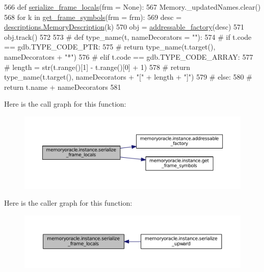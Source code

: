 \begin{DoxyCode}
566 \textcolor{keyword}{def }\hyperlink{namespacememoryoracle_1_1instance_a958b2f6afa09c327a9e48bbe2fc7f125}{serialize\_frame\_locals}(frm = None):
567     Memory.\_updatedNames.clear()
568     \textcolor{keywordflow}{for} k \textcolor{keywordflow}{in} \hyperlink{namespacememoryoracle_1_1instance_a31e7e3135691ee03e847163a5b1e3950}{get\_frame\_symbols}(frm = frm):
569         desc = \hyperlink{classmemoryoracle_1_1descriptions_1_1MemoryDescription}{descriptions.MemoryDescription}(k)
570         obj = \hyperlink{namespacememoryoracle_1_1instance_ac651a8635b1ae2ee7e788bf9adb17a0b}{addressable\_factory}(desc)
571         obj.track()
572 
573 \textcolor{comment}{# def type\_name(t, nameDecorators = ""):}
574 \textcolor{comment}{#     if t.code == gdb.TYPE\_CODE\_PTR:}
575 \textcolor{comment}{#         return type\_name(t.target(), nameDecorators + "*")}
576 \textcolor{comment}{#     elif t.code == gdb.TYPE\_CODE\_ARRAY:}
577 \textcolor{comment}{#         length = str(t.range()[1] - t.range()[0] + 1)}
578 \textcolor{comment}{#         return type\_name(t.target(), nameDecorators + "[" + length + "]")}
579 \textcolor{comment}{#     else:}
580 \textcolor{comment}{#         return t.name + nameDecorators}
581 
\end{DoxyCode}


Here is the call graph for this function\+:\nopagebreak
\begin{figure}[H]
\begin{center}
\leavevmode
\includegraphics[width=350pt]{namespacememoryoracle_1_1instance_a958b2f6afa09c327a9e48bbe2fc7f125_cgraph}
\end{center}
\end{figure}




Here is the caller graph for this function\+:\nopagebreak
\begin{figure}[H]
\begin{center}
\leavevmode
\includegraphics[width=350pt]{namespacememoryoracle_1_1instance_a958b2f6afa09c327a9e48bbe2fc7f125_icgraph}
\end{center}
\end{figure}


